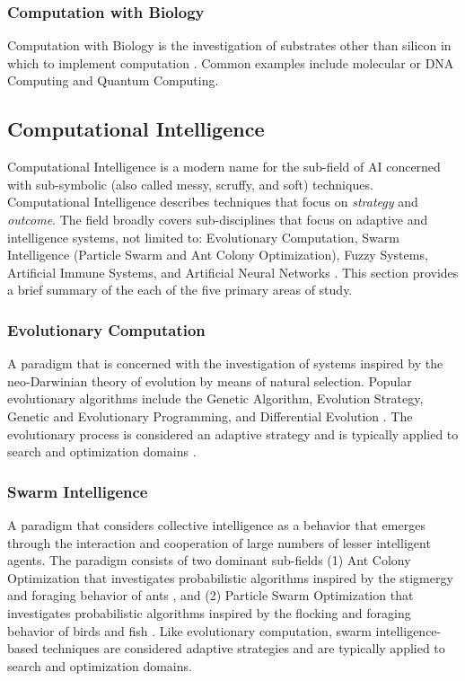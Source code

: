 \begin{bibunit}
\subsubsection{Computation with Biology}
Computation with Biology is the investigation of substrates other than silicon in which to implement computation \cite{Aaronson2005}. Common examples include molecular or DNA Computing and Quantum Computing.

% 
% 
\subsection{Computational Intelligence}
\label{sec:computationl_intelligence}
Computational Intelligence is a modern name for the sub-field of AI concerned with sub-symbolic (also called messy, scruffy, and soft) techniques. Computational Intelligence describes techniques that focus on \emph{strategy} and \emph{outcome}. 
The field broadly covers sub-disciplines that focus on adaptive and intelligence systems, not limited to: Evolutionary Computation, Swarm Intelligence (Particle Swarm and Ant Colony Optimization), Fuzzy Systems, Artificial Immune Systems, and Artificial Neural Networks \cite{Engelbrecht2007, Pedrycz1997}. This section provides a brief summary of the each of the five primary areas of study.

\subsubsection{Evolutionary Computation} 
A paradigm that is concerned with the investigation of systems inspired by the neo-Darwinian theory of evolution by means of natural selection. Popular evolutionary algorithms include the Genetic Algorithm, Evolution Strategy, Genetic and Evolutionary Programming, and Differential Evolution \cite{Baeck2000, Baeck2000a}. The evolutionary process is considered an adaptive strategy and is typically applied to search and optimization domains \cite{Goldberg1989, Holland1975}.

\subsubsection{Swarm Intelligence} 
A paradigm that considers collective intelligence as a behavior that emerges through the interaction and cooperation of large numbers of lesser intelligent agents. The paradigm consists of two dominant sub-fields (1) Ant Colony Optimization that investigates probabilistic algorithms inspired by the stigmergy and foraging behavior of ants \cite{Bonabeau1999, Dorigo2004}, and (2) Particle Swarm Optimization that investigates probabilistic algorithms inspired by the flocking and foraging behavior of birds and fish \cite{Shi2001}. Like evolutionary computation, swarm intelligence-based techniques are considered adaptive strategies and are typically applied to search and optimization domains.


\end{bibunit}
